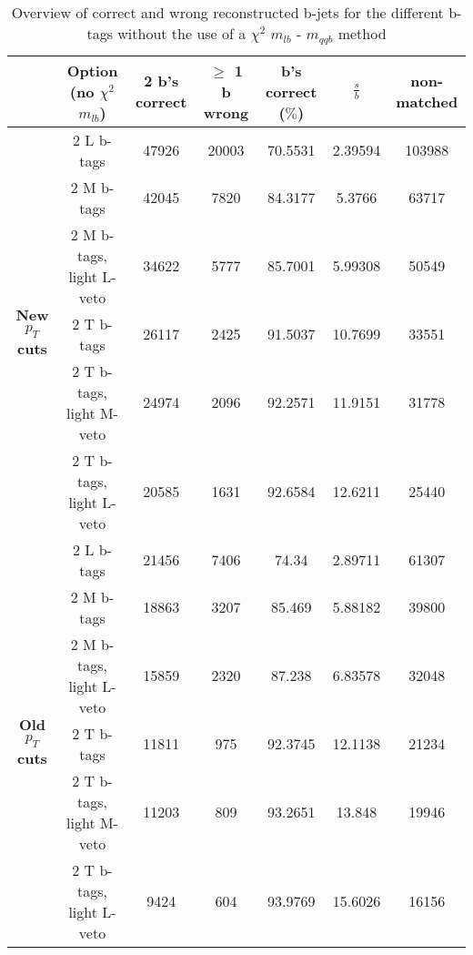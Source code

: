 \documentclass[a4paper,12pt]{report}
\begin{document}
\begin{landscape}
 \begin{table}[!h] 
 \begin{tabular}{c|c|c|c|c|c|c} 
&\textbf{Option} (no $\chi^{2}$ $m_{lb}$) & 2 b's correct & $\geq$ 1 b wrong & b's correct ($\%$) & $\frac{s}{b}$ & non-matched \\ \hline 
\multirow{6}{*}{\textbf{New $p_T$ cuts}} 
& 2 L b-tags              & 47926 & 20003 & 70.5531 & 2.39594 & 103988  \\ 
& 2 M b-tags              & 42045 & 7820 & 84.3177 & 5.3766 & 63717  \\ 
& 2 M b-tags, light L-veto & 34622 & 5777 & 85.7001 & 5.99308 & 50549  \\ 
& 2 T b-tags              & 26117 & 2425 & 91.5037 & 10.7699 & 33551  \\ 
& 2 T b-tags, light M-veto & 24974 & 2096 & 92.2571 & 11.9151 & 31778  \\ 
& 2 T b-tags, light L-veto & 20585 & 1631 & 92.6584 & 12.6211 & 25440  \\ 
\hline
\multirow{6}{*}{\textbf{Old $p_T$ cuts}} 
& 2 L b-tags              & 21456 & 7406 & 74.34 & 2.89711 & 61307  \\ 
& 2 M b-tags              & 18863 & 3207 & 85.469 & 5.88182 & 39800  \\ 
& 2 M b-tags, light L-veto & 15859 & 2320 & 87.238 & 6.83578 & 32048  \\ 
& 2 T b-tags              & 11811 & 975 & 92.3745 & 12.1138 & 21234  \\ 
& 2 T b-tags, light M-veto & 11203 & 809 & 93.2651 & 13.848 & 19946  \\ 
& 2 T b-tags, light L-veto & 9424 & 604 & 93.9769 & 15.6026 & 16156  \\ 
 \end{tabular} 
\caption{Overview of correct and wrong reconstructed b-jets for the different b-tags without the use of a $\chi^{2}$ $m_{lb}$ - $m_{qqb}$ method} 
 \end{table} 
 

\end{landscape}
\end{document}

